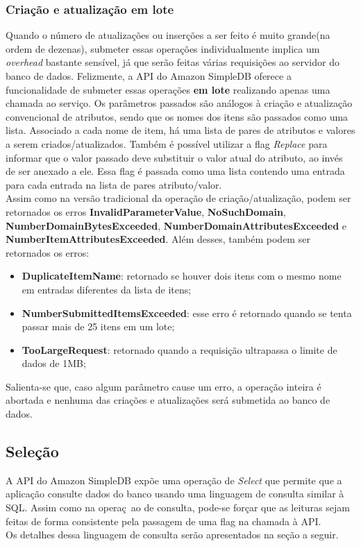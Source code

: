 \subsubsection{Criação e atualização em lote}
Quando o número de atualizações ou inserções a ser feito é muito grande(na ordem de dezenas), submeter essas operações individualmente implica um \textit{overhead} bastante sensível, já que serão feitas várias requisições ao servidor do banco de dados. Felizmente, a API do Amazon SimpleDB oferece a funcionalidade de submeter essas operações \textbf{em lote} realizando apenas uma chamada ao serviço. Os parâmetros passados são análogos à criação e atualização convencional de atributos, sendo que os nomes dos itens são passados como uma lista. Associado a cada nome de item, há uma lista de pares de atributos e valores a serem criados/atualizados. Também é possível utilizar a flag \textit{Replace} para informar que o valor passado deve substituir o valor atual do atributo, ao invés de ser anexado a ele. Essa flag é passada como uma lista contendo uma entrada para cada entrada na lista de pares atributo/valor.\\
Assim como na versão tradicional da operação de criação/atualização, podem ser retornados os erros \textbf{InvalidParameterValue}, \textbf{NoSuchDomain}, \textbf{NumberDomainBytesExceeded}, \textbf{NumberDomainAttributesExceeded} e \textbf{NumberItemAttributesExceeded}. Além desses, também podem ser retornados os erros:
\\
\begin{itemize}
	\item \textbf{DuplicateItemName}: retornado se houver dois itens com o mesmo nome em entradas diferentes da lista de itens;
	\item \textbf{NumberSubmittedItemsExceeded}: esse erro é retornado quando se tenta passar mais de 25 itens em um lote;
	\item \textbf{TooLargeRequest}: retornado quando a requisição ultrapassa o limite de dados de 1MB;
\end{itemize}

Salienta-se que, caso algum parâmetro cause um erro, a operação inteira é abortada e nenhuma das criações e atualizações será submetida ao banco de dados.

\subsection{Seleção}
A API do Amazon SimpleDB expõe uma operação de \textit{Select} que permite que a aplicação consulte dados do banco usando uma linguagem de consulta similar à SQL. Assim como na operaç~ao de consulta, pode-se forçar que as leituras sejam feitas de forma consistente pela passagem de uma flag na chamada à API.\\
Os detalhes dessa linguagem de consulta serão apresentados na seção a seguir.
